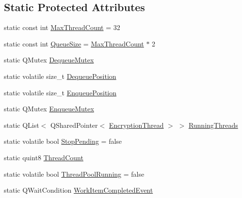 \subsection*{Static Protected Attributes}
\begin{DoxyCompactItemize}
\item 
static const int \hyperlink{class_gost_crypt_1_1_volume_1_1_encryption_thread_pool_a78cc5bd72468a8d630f01b1cf1782c89}{Max\+Thread\+Count} = 32
\item 
static const int \hyperlink{class_gost_crypt_1_1_volume_1_1_encryption_thread_pool_adb08affe3ba56827c426968e5b6be24c}{Queue\+Size} = \hyperlink{class_gost_crypt_1_1_volume_1_1_encryption_thread_pool_a78cc5bd72468a8d630f01b1cf1782c89}{Max\+Thread\+Count} $\ast$ 2
\item 
static Q\+Mutex \hyperlink{class_gost_crypt_1_1_volume_1_1_encryption_thread_pool_ac906666effd89b9938eb557878cb24c4}{Dequeue\+Mutex}
\item 
static volatile size\+\_\+t \hyperlink{class_gost_crypt_1_1_volume_1_1_encryption_thread_pool_abd7c1a52412083f8ee43610bc63e6f38}{Dequeue\+Position}
\item 
static volatile size\+\_\+t \hyperlink{class_gost_crypt_1_1_volume_1_1_encryption_thread_pool_a7b19c8f36e15a44ed9832360345a8d60}{Enqueue\+Position}
\item 
static Q\+Mutex \hyperlink{class_gost_crypt_1_1_volume_1_1_encryption_thread_pool_af10e0e9274cd7e76aecd24b89348bf50}{Enqueue\+Mutex}
\item 
static Q\+List$<$ Q\+Shared\+Pointer$<$ \hyperlink{class_gost_crypt_1_1_volume_1_1_encryption_thread}{Encryption\+Thread} $>$ $>$ \hyperlink{class_gost_crypt_1_1_volume_1_1_encryption_thread_pool_accae3cb0cb9910b8f2a4c9d57dfd164f}{Running\+Threads}
\item 
static volatile bool \hyperlink{class_gost_crypt_1_1_volume_1_1_encryption_thread_pool_af1764b3bd39d651fbeb9ecb9ea877ee2}{Stop\+Pending} = false
\item 
static quint8 \hyperlink{class_gost_crypt_1_1_volume_1_1_encryption_thread_pool_ae18a0cdf69ea2de0a3863b96c0a683b8}{Thread\+Count}
\item 
static volatile bool \hyperlink{class_gost_crypt_1_1_volume_1_1_encryption_thread_pool_a835cecade7ea381d3930976415610b21}{Thread\+Pool\+Running} = false
\item 
static Q\+Wait\+Condition \hyperlink{class_gost_crypt_1_1_volume_1_1_encryption_thread_pool_a16603aaf09b118a6c152e7d86cd63e64}{Work\+Item\+Completed\+Event}
\item 

\end{DoxyCompactItemize}
